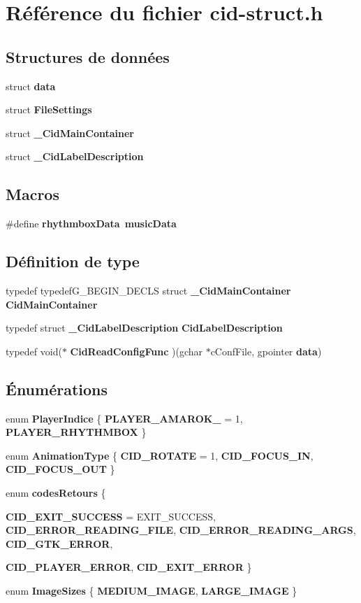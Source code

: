 \section{Référence du fichier cid-struct.h}
\label{cid-struct_8h}
\subsection*{Structures de données}
\begin{CompactItemize}
\item 
struct {\bf data}
\item 
struct {\bf FileSettings}
\item 
struct {\bf \_\-CidMainContainer}
\item 
struct {\bf \_\-CidLabelDescription}
\end{CompactItemize}
\subsection*{Macros}
\begin{CompactItemize}
\item 
\#define {\bf rhythmboxData}~{\bf musicData}
\end{CompactItemize}
\subsection*{Définition de type}
\begin{CompactItemize}
\item 
typedef typedefG\_\-BEGIN\_\-DECLS struct {\bf \_\-CidMainContainer} {\bf CidMainContainer}
\item 
typedef struct {\bf \_\-CidLabelDescription} {\bf CidLabelDescription}
\item 
typedef void($\ast$ {\bf CidReadConfigFunc} )(gchar $\ast$cConfFile, gpointer {\bf data})
\end{CompactItemize}
\subsection*{Énumérations}
\begin{CompactItemize}
\item 
enum {\bf PlayerIndice} \{ {\bf PLAYER\_\-AMAROK\_} = 1, 
{\bf PLAYER\_\-RHYTHMBOX}
 \}
\item 
enum {\bf AnimationType} \{ {\bf CID\_\-ROTATE} = 1, 
{\bf CID\_\-FOCUS\_\-IN}, 
{\bf CID\_\-FOCUS\_\-OUT}
 \}
\item 
enum {\bf codesRetours} \{ \par
{\bf CID\_\-EXIT\_\-SUCCESS} = EXIT\_\-SUCCESS, 
{\bf CID\_\-ERROR\_\-READING\_\-FILE}, 
{\bf CID\_\-ERROR\_\-READING\_\-ARGS}, 
{\bf CID\_\-GTK\_\-ERROR}, 
\par
{\bf CID\_\-PLAYER\_\-ERROR}, 
{\bf CID\_\-EXIT\_\-ERROR}
 \}
\item 
enum {\bf ImageSizes} \{ {\bf MEDIUM\_\-IMAGE}, 
{\bf LARGE\_\-IMAGE}
 \}
\end{CompactItemize}
